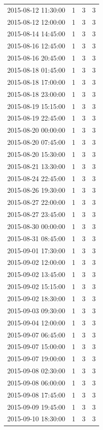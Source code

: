 \begin{tabular}{lrrr}
2015-08-12 11:30:00 & 1 & 3 & 3 \\
2015-08-12 12:00:00 & 1 & 3 & 3 \\
2015-08-14 14:45:00 & 1 & 3 & 3 \\
2015-08-16 12:45:00 & 1 & 3 & 3 \\
2015-08-16 20:45:00 & 1 & 3 & 3 \\
2015-08-18 01:45:00 & 1 & 3 & 3 \\
2015-08-18 17:00:00 & 1 & 3 & 3 \\
2015-08-18 23:00:00 & 1 & 3 & 3 \\
2015-08-19 15:15:00 & 1 & 3 & 3 \\
2015-08-19 22:45:00 & 1 & 3 & 3 \\
2015-08-20 00:00:00 & 1 & 3 & 3 \\
2015-08-20 07:45:00 & 1 & 3 & 3 \\
2015-08-20 15:30:00 & 1 & 3 & 3 \\
2015-08-21 13:30:00 & 1 & 3 & 3 \\
2015-08-24 22:45:00 & 1 & 3 & 3 \\
2015-08-26 19:30:00 & 1 & 3 & 3 \\
2015-08-27 22:00:00 & 1 & 3 & 3 \\
2015-08-27 23:45:00 & 1 & 3 & 3 \\
2015-08-30 00:00:00 & 1 & 3 & 3 \\
2015-08-31 08:45:00 & 1 & 3 & 3 \\
2015-09-01 17:30:00 & 1 & 3 & 3 \\
2015-09-02 12:00:00 & 1 & 3 & 3 \\
2015-09-02 13:45:00 & 1 & 3 & 3 \\
2015-09-02 15:15:00 & 1 & 3 & 3 \\
2015-09-02 18:30:00 & 1 & 3 & 3 \\
2015-09-03 09:30:00 & 1 & 3 & 3 \\
2015-09-04 12:00:00 & 1 & 3 & 3 \\
2015-09-07 06:45:00 & 1 & 3 & 3 \\
2015-09-07 15:00:00 & 1 & 3 & 3 \\
2015-09-07 19:00:00 & 1 & 3 & 3 \\
2015-09-08 02:30:00 & 1 & 3 & 3 \\
2015-09-08 06:00:00 & 1 & 3 & 3 \\
2015-09-08 17:45:00 & 1 & 3 & 3 \\
2015-09-09 19:45:00 & 1 & 3 & 3 \\
2015-09-10 18:30:00 & 1 & 3 & 3 \\

\end{tabular}
